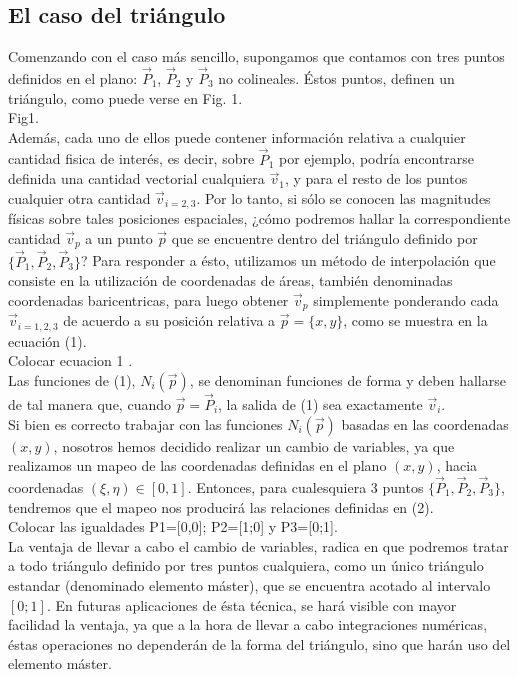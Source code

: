 \subsection{El caso del triángulo}
\label{sec:triangulos}
Comenzando con el caso más sencillo, supongamos que contamos con tres puntos definidos en el plano: $ \vec{P}_{1} $, $ \vec{P}_{2} $ y $ \vec{P}_{3} $ no colineales. Éstos puntos, definen un triángulo, como puede verse en Fig. 1.
\\
Fig1.
\\
Además, cada uno de ellos puede contener información relativa a cualquier cantidad fisica de interés, es decir, sobre $ \vec{P}_{1} $ por ejemplo, podría encontrarse definida una cantidad vectorial cualquiera $ \vec{v}_{1}$, y para el resto de los puntos cualquier otra cantidad $ \vec{v}_{i=2,3} $. Por lo tanto, si sólo se conocen las magnitudes físicas sobre tales posiciones espaciales, ¿cómo podremos hallar la correspondiente cantidad $ \vec{v}_{p} $ a un punto $\vec{p}$ que se encuentre dentro del triángulo definido por $ \lbrace \vec{P}_{1}, \vec{P}_{2}, \vec{P}_{3}  \rbrace $? Para responder a ésto, utilizamos un método de interpolación que consiste en la utilización de coordenadas de áreas, también denominadas coordenadas baricentricas, para luego obtener $ \vec{v}_{p} $ simplemente ponderando cada $ \vec{v}_{i=1,2,3} $ de acuerdo a su posición relativa a $ \vec{p} = \lbrace x,y \rbrace $, como se muestra en la ecuación (1).
\\
Colocar ecuacion 1 .
\\
Las funciones de (1), $ N_{i} ( \vec{p} )$, se denominan funciones de forma y deben hallarse de tal manera que, cuando $ \vec{p} = \vec{P}_{i} $, la salida de (1) sea exactamente $\vec{v}_{i}$.\\
Si bien es correcto trabajar con las funciones $ N_{i} ( \vec{p} )$ basadas en las coordenadas $(x,y)$, nosotros hemos decidido realizar un cambio de variables, ya que realizamos un mapeo de las coordenadas definidas en el plano $(x,y)$, hacia coordenadas $ (\xi, \eta) \in [0, 1] $. Entonces, para cualesquiera 3 puntos $ \lbrace \vec{P}_{1}, \vec{P}_{2}, \vec{P}_{3}  \rbrace $, tendremos que el mapeo nos producirá las relaciones definidas en (2).
\\
Colocar las igualdades P1=[0,0]; P2=[1;0] y P3=[0;1].
\\
La ventaja de llevar a cabo el cambio de variables, radica en que podremos tratar a todo triángulo definido por tres puntos cualquiera, como un único triángulo estandar (denominado elemento máster), que se encuentra acotado al intervalo $ [0; 1] $. En futuras aplicaciones de ésta técnica, se hará visible con mayor facilidad la ventaja, ya que a la hora de llevar a cabo integraciones numéricas, éstas operaciones no dependerán de la forma del triángulo, sino que harán uso del elemento máster. 
